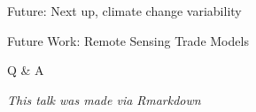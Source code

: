\documentclass[ignorenonframetext,]{beamer}
\begin{document}
\begin{frame}{Future: Next up, climate change variability}
\protect\hypertarget{future-next-up-climate-change-variability-1}{}

\end{frame}

\begin{frame}{Future Work: Remote Sensing Trade Models}
\protect\hypertarget{future-work-remote-sensing-trade-models}{}

\end{frame}

\begin{frame}{Q \& A}
\protect\hypertarget{q-a}{}

\emph{This talk was made via Rmarkdown}

\end{frame}
\end{document}
